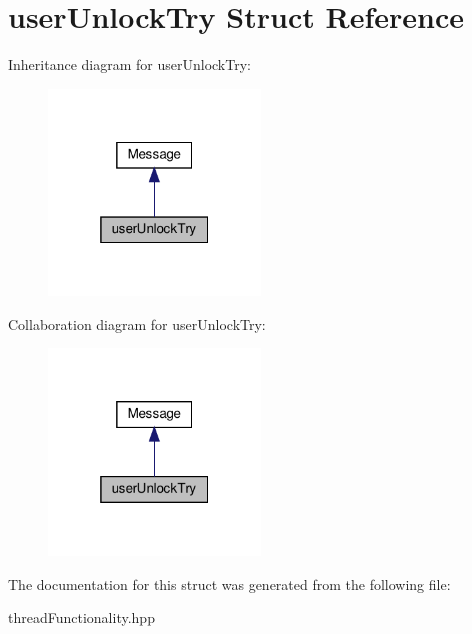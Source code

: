 \hypertarget{structuserUnlockTry}{}\section{user\+Unlock\+Try Struct Reference}
\label{structuserUnlockTry}


Inheritance diagram for user\+Unlock\+Try\+:\nopagebreak
\begin{figure}[H]
\begin{center}
\leavevmode
\includegraphics[width=160pt]{structuserUnlockTry__inherit__graph}
\end{center}
\end{figure}


Collaboration diagram for user\+Unlock\+Try\+:\nopagebreak
\begin{figure}[H]
\begin{center}
\leavevmode
\includegraphics[width=160pt]{structuserUnlockTry__coll__graph}
\end{center}
\end{figure}


The documentation for this struct was generated from the following file\+:\begin{DoxyCompactItemize}
\item 
thread\+Functionality.\+hpp\end{DoxyCompactItemize}
